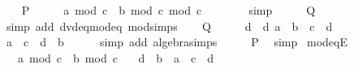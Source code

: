 \begin{isabellebody}
%
\isadelimproof
%
\endisadelimproof
%
\isatagproof
{}\isamarkupfalse%
\isanewline
\ \ \isamarkupfalse%
\ {\isacharquery}{\kern0pt}P\isanewline
\ \ \isamarkupfalse%
\ \isamarkupfalse%
\ {\isachardoublequoteopen}{\isacharparenleft}{\kern0pt}a\ mod\ c\ {\isacharminus}{\kern0pt}\ b\ mod\ c{\isacharparenright}{\kern0pt}\ mod\ c\ {\isacharequal}{\kern0pt}\ {}{\isachardoublequoteclose}\isanewline
\ \ \ \ \isamarkupfalse%
\ simp\isanewline
\ \ \isamarkupfalse%
\ \isamarkupfalse%
\ {\isacharquery}{\kern0pt}Q\isanewline
\ \ \ \ \isamarkupfalse%
\ {\isacharparenleft}{\kern0pt}simp\ add{\isacharcolon}{\kern0pt}\ dvd{\isacharunderscore}{\kern0pt}eq{\isacharunderscore}{\kern0pt}mod{\isacharunderscore}{\kern0pt}eq{\isacharunderscore}{\kern0pt}{}\ mod{\isacharunderscore}{\kern0pt}simps{\isacharparenright}{\kern0pt}\isanewline
{}\isamarkupfalse%
\isanewline
\ \ \isamarkupfalse%
\ {\isacharquery}{\kern0pt}Q\isanewline
\ \ \isamarkupfalse%
\ \isamarkupfalse%
\ d\ \ d{\isacharcolon}{\kern0pt}\ {\isachardoublequoteopen}a\ {\isacharminus}{\kern0pt}\ b\ {\isacharequal}{\kern0pt}\ c\ {\isacharasterisk}{\kern0pt}\ d{\isachardoublequoteclose}\ \isacommand{{\isachardot}{\kern0pt}{\isachardot}{\kern0pt}}\isamarkupfalse%
\isanewline
\ \ \isamarkupfalse%
\ \isamarkupfalse%
\ {\isachardoublequoteopen}a\ {\isacharequal}{\kern0pt}\ c\ {\isacharasterisk}{\kern0pt}\ d\ {\isacharplus}{\kern0pt}\ b{\isachardoublequoteclose}\isanewline
\ \ \ \ \isamarkupfalse%
\ {\isacharparenleft}{\kern0pt}simp\ add{\isacharcolon}{\kern0pt}\ algebra{\isacharunderscore}{\kern0pt}simps{\isacharparenright}{\kern0pt}\isanewline
\ \ \isamarkupfalse%
\ \isamarkupfalse%
\ {\isacharquery}{\kern0pt}P\ \isamarkupfalse%
\ simp\isanewline
{}\isamarkupfalse%
%
\endisatagproof
{\isafoldproof}%
%
\isadelimproof
\isanewline
%
\endisadelimproof
\isanewline
{}\isamarkupfalse%
\ mod{\isacharunderscore}{\kern0pt}eqE{\isacharcolon}{\kern0pt}\isanewline
\ \ \ {\isachardoublequoteopen}a\ mod\ c\ {\isacharequal}{\kern0pt}\ b\ mod\ c{\isachardoublequoteclose}\isanewline
\ \ \ d\ \ {\isachardoublequoteopen}b\ {\isacharequal}{\kern0pt}\ a\ {\isacharplus}{\kern0pt}\ c\ {\isacharasterisk}{\kern0pt}\ d{\isachardoublequoteclose}\isanewline

\end{isabellebody}
